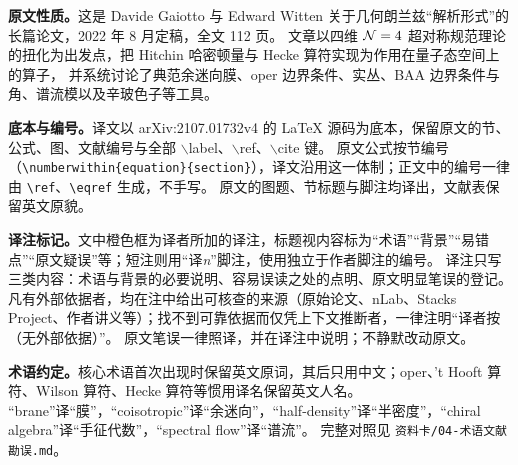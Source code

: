 \documentclass[UTF8, a4paper, 11pt, fontset=windows]{ctexart}
\begin{document}
\textbf{原文性质。}这是 Davide Gaiotto 与 Edward Witten 关于几何朗兰兹“解析形式”的长篇论文，2022 年 8 月定稿，全文 112 页。
文章以四维 ${\mathcal N}=4$ 超对称规范理论的扭化为出发点，把 Hitchin 哈密顿量与 Hecke 算符实现为作用在量子态空间上的算子，
并系统讨论了典范余迷向膜、oper 边界条件、实丛、BAA 边界条件与角、谱流模以及辛玻色子等工具。

\textbf{底本与编号。}译文以 arXiv:2107.01732v4 的 LaTeX 源码为底本，保留原文的节、公式、图、文献编号与全部 $\backslash$label、$\backslash$ref、$\backslash$cite 键。
原文公式按节编号（\verb|\numberwithin{equation}{section}|），译文沿用这一体制；正文中的编号一律由 \verb|\ref|、\verb|\eqref| 生成，不手写。
原文的图题、节标题与脚注均译出，文献表保留英文原貌。

\textbf{译注标记。}文中橙色框为译者所加的译注，标题视内容标为“术语”“背景”“易错点”“原文疑误”等；短注则用“译\textit{n}”脚注，使用独立于作者脚注的编号。
译注只写三类内容：术语与背景的必要说明、容易误读之处的点明、原文明显笔误的登记。
凡有外部依据者，均在注中给出可核查的来源（原始论文、nLab、Stacks Project、作者讲义等）；找不到可靠依据而仅凭上下文推断者，一律注明“译者按（无外部依据）”。
原文笔误一律照译，并在译注中说明；不静默改动原文。

\textbf{术语约定。}核心术语首次出现时保留英文原词，其后只用中文；oper、't Hooft 算符、Wilson 算符、Hecke 算符等惯用译名保留英文人名。
“brane”译“膜”，“coisotropic”译“余迷向”，“half-density”译“半密度”，“chiral algebra”译“手征代数”，“spectral flow”译“谱流”。
完整对照见 \verb|资料卡/04-术语文献勘误.md|。

\newpage
\tableofcontents
\newpage


















\clearpage
{}
{}

\end{document}
